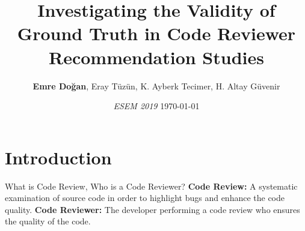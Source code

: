 \documentclass{beamer}
\title{Investigating the Validity of Ground Truth in Code Reviewer Recommendation Studies }
\author[ESEM 2019]{
 \textbf{Emre Doğan}, Eray Tüzün, K. Ayberk Tecimer, H. Altay Güvenir}
\institute{MSc Student \newline Computer Engineering Department \newline Bilkent University \newline Ankara, TURKEY}
\date
    {\small\textit{{ESEM 2019}}\newline
    \today
    }
\begin{document}
\begin{frame}
  \titlepage
\end{frame}

%


\section{Introduction}


\begin{frame}{\large What is Code Review, Who is a Code Reviewer?}
    \textbf{Code Review:} A systematic examination of source code in order to highlight bugs and enhance the code quality.
    \pause
  \newline \newline
  \textbf{Code Reviewer:} The developer performing a code review who ensures the quality of the code.
  \pause
    
  
\end{frame}
\end{document}
